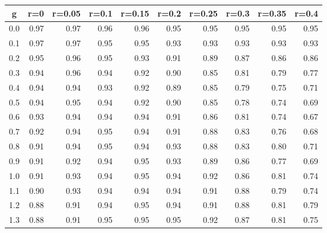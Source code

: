%
\begin{table}[!tbp]
 \begin{center}
 \begin{tabular}{rrrrrrrrrr}\hline\hline
\multicolumn{1}{c}{g}&\multicolumn{1}{c}{r=0}&\multicolumn{1}{c}{r=0.05}&\multicolumn{1}{c}{r=0.1}&\multicolumn{1}{c}{r=0.15}&\multicolumn{1}{c}{r=0.2}&\multicolumn{1}{c}{r=0.25}&\multicolumn{1}{c}{r=0.3}&\multicolumn{1}{c}{r=0.35}&\multicolumn{1}{c}{r=0.4}\tabularnewline
\hline
0.0&0.97&0.97&0.96&0.96&0.95&0.95&0.95&0.95&0.95\tabularnewline
0.1&0.97&0.97&0.95&0.95&0.93&0.93&0.93&0.93&0.93\tabularnewline
0.2&0.95&0.96&0.95&0.93&0.91&0.89&0.87&0.86&0.86\tabularnewline
0.3&0.94&0.96&0.94&0.92&0.90&0.85&0.81&0.79&0.77\tabularnewline
0.4&0.94&0.94&0.93&0.92&0.89&0.85&0.79&0.75&0.71\tabularnewline
0.5&0.94&0.95&0.94&0.92&0.90&0.85&0.78&0.74&0.69\tabularnewline
0.6&0.93&0.94&0.94&0.94&0.91&0.86&0.81&0.74&0.67\tabularnewline
0.7&0.92&0.94&0.95&0.94&0.91&0.88&0.83&0.76&0.68\tabularnewline
0.8&0.91&0.94&0.95&0.94&0.93&0.88&0.83&0.80&0.71\tabularnewline
0.9&0.91&0.92&0.94&0.95&0.93&0.89&0.86&0.77&0.69\tabularnewline
1.0&0.91&0.93&0.94&0.95&0.94&0.92&0.86&0.81&0.74\tabularnewline
1.1&0.90&0.93&0.94&0.94&0.94&0.91&0.88&0.79&0.74\tabularnewline
1.2&0.88&0.91&0.94&0.95&0.94&0.91&0.88&0.81&0.79\tabularnewline
1.3&0.88&0.91&0.95&0.95&0.95&0.92&0.87&0.81&0.75\tabularnewline
\hline
\end{tabular}

\end{center}

\end{table}

